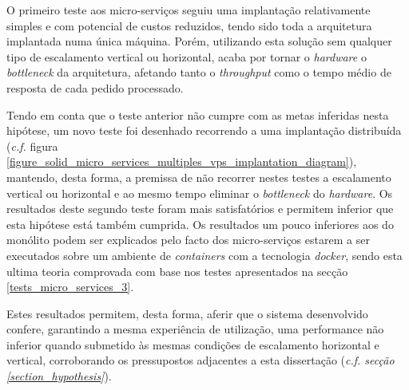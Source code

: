 O primeiro teste aos micro-serviços seguiu uma implantação relativamente simples e com potencial de custos reduzidos, tendo sido toda a arquitetura implantada numa única máquina.
Porém, utilizando esta solução sem qualquer tipo de escalamento vertical ou horizontal, acaba por tornar o \emph{hardware} o \emph{bottleneck} da arquitetura, afetando tanto o \emph{throughput} como o tempo médio de resposta de cada pedido processado.

Tendo em conta que o teste anterior não cumpre com as metas inferidas nesta hipótese, um novo teste foi desenhado recorrendo a uma implantação distribuída (\emph{c.f.} figura \ref{figure_solid_micro_services_multiples_vps_implantation_diagram}), mantendo, desta forma, a premissa de não recorrer nestes testes a escalamento vertical ou horizontal e ao mesmo tempo eliminar o \emph{bottleneck} do \emph{hardware}. Os resultados deste segundo teste foram mais satisfatórios e permitem inferior que esta hipótese está também cumprida. Os resultados um pouco inferiores aos do monólito podem ser explicados pelo facto dos micro-serviços estarem a ser executados sobre um ambiente de \emph{containers} com a tecnologia \emph{docker}, sendo esta ultima teoria comprovada com base nos testes apresentados na secção \ref{tests_micro_services_3}.

Estes resultados permitem, desta forma, aferir que o sistema desenvolvido confere, garantindo a mesma experiência de utilização, uma performance não inferior quando submetido às mesmas condições de escalamento horizontal e vertical, corroborando os pressupostos adjacentes a esta dissertação (\emph{c.f. secção \ref{section_hypothesis}}).

